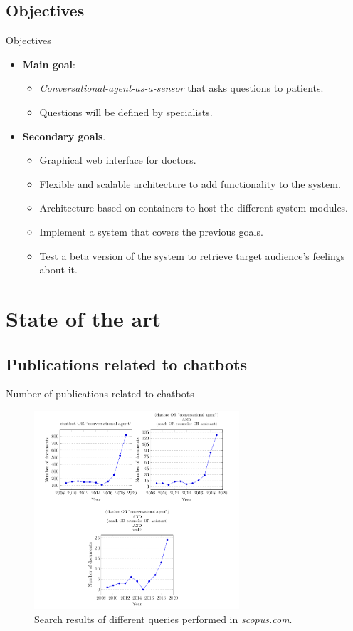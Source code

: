 \documentclass{beamer}
\begin{document}
\subsection{Objectives}
\begin{frame}[fragile]{Objectives}
  \begin{itemize}[<+->]
    \item \textbf{Main goal}:
    \begin{itemize}[<+->]
      \item \emph{Conversational-agent-as-a-sensor} that asks questions to patients.
      \item Questions will be defined by specialists.
    \end{itemize}
    \item \textbf{Secondary goals}.
      \begin{itemize}[<+->]
        \item Graphical web interface for doctors.
        \item Flexible and scalable architecture to add functionality to the system.
        \item Architecture based on containers to host the different system modules.
        \item Implement a system that covers the previous goals.
        \item Test a beta version of the system to retrieve target audience’s feelings about it.
      \end{itemize}
  \end{itemize}
\end{frame}
\section{State of the art}

\subsection{Publications related to chatbots}
\begin{frame}[fragile]{Number of publications related to chatbots}
  \begin{figure}
    \includegraphics[width=0.68\textwidth]{publications.png}
    \caption{Search results of different queries performed in \textit{scopus.com}.}
  \end{figure}
\end{frame}
\end{document}
